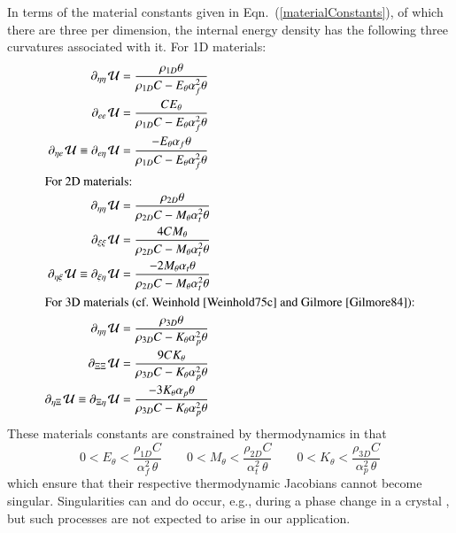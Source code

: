 In terms of the material constants given in Eqn.~(\ref{materialConstants}), of which there are three per dimension, the internal energy density has the following three curvatures associated with it.  For 1D materials:
\begin{subequations}
    \label{internalEnergies}
    \begin{align}
    \partial_{\eta\eta\,} \mathcal{U} & = 
    \frac{\rho_{1D}\theta}{\rho_{1D} C - E_{\theta} \alpha_f^2 \theta } \\
    \partial_{ee\,} \mathcal{U} & = \frac{C E_{\theta}}
    {\rho_{1D} C - E_{\theta} \alpha_f^2 \theta} \\
    \partial_{\eta e\,} \mathcal{U} \equiv \partial_{e \eta\,} \mathcal{U} & = 
    \frac{-E_{\theta} \alpha_f \theta}{\rho_{1D} C - E_{\theta} \alpha_f^2 \theta} \\
    \intertext{For 2D materials:}
    \partial_{\eta\eta\,} \mathcal{U} & = 
    \frac{\rho_{2D} \theta}{\rho_{2D} C - M_{\theta} \alpha_t^2 \theta} \\
    \partial_{\xi\xi\,} \mathcal{U} & = \frac{4 C M_{\theta}}
    {\rho_{2D} C - M_{\theta} \alpha_t^2 \theta} \\
    \partial_{\eta \xi\,} \mathcal{U} \equiv \partial_{\xi \eta\,} \mathcal{U} & = 
    \frac{-2M_{\theta} \alpha_t \theta}
    {\rho_{2D} C - M_{\theta} \alpha_t^2 \theta} \\
    \intertext{For 3D materials (cf.\ Weinhold \cite{Weinhold75c} and Gilmore \cite{Gilmore84}):}
    \partial_{\eta\eta\,} \mathcal{U} & = 
    \frac{\rho_{3D} \theta}{\rho_{3D} C - K_{\theta} \alpha_p^2 \theta} \\
    \partial_{\Xi\Xi\,} \mathcal{U} & = \frac{9 C K_{\theta}}
    {\rho_{3D} C - K_{\theta} \alpha_p^2 \theta} \\
    \partial_{\eta\Xi\,} \mathcal{U} \equiv 
    \partial_{\Xi\eta\,} \mathcal{U} & = 
    \frac{-3K_{\theta} \alpha_p \theta}{\rho_{3D} C - K_{\theta} \alpha_p^2 \theta}
    \end{align}
\end{subequations}
These materials constants are constrained by thermo\-dynamics in that
\begin{equation}
    \label{thermodynamicConstraints}
    0 < E_{\theta} < \frac{\rho_{1D} C}{\alpha_f^2 \, \theta} \qquad
    0 < M_{\theta} < \frac{\rho_{2D} C}{\alpha_t^2 \, \theta} \qquad
    0 < K_{\theta} < \frac{\rho_{3D} C}{\alpha_p^2 \, \theta}
\end{equation} 
which ensure that their respective thermo\-dynamic Jacobians cannot become singular. Singularities can and do occur, e.g., during a phase change in a crystal \cite{McLellan76,Gilmore84}, but such processes are not expected to arise in our application.


